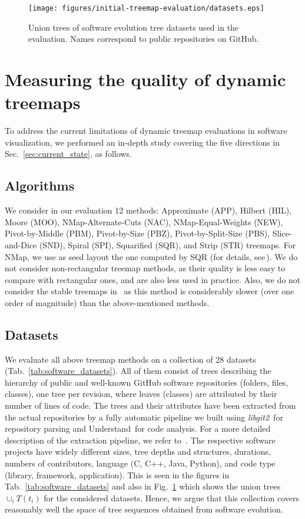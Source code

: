 \begin{figure}[htbp!]
\centering
\texttt{[image: figures/initial-treemap-evaluation/datasets.eps]}
\caption{Union trees of software evolution tree datasets used in the evaluation. Names correspond to public repositories on GitHub.}
\label{fig:datasets}
\end{figure}


\section{Measuring the quality of dynamic treemaps}
\label{sec:init_metrics}
%
%
To address the current limitations of dynamic treemap evaluations in software visualization, we performed an in-depth study covering the five directions in Sec.~\ref{sec:current_state}, as follows.

\subsection{Algorithms}
\label{sec:mat_algos}
%
We consider in our evaluation 12 methods: Approximate (APP), Hilbert (HIL), Moore (MOO), NMap-Alternate-Cuts (NAC), NMap-Equal-Weights (NEW), Pivot-by-Middle (PBM), Pivot-by-Size (PBZ), Pivot-by-Split-Size (PBS), Slice-and-Dice (SND), Spiral (SPI), Squarified (SQR), and Strip (STR) treemaps. For NMap, we use as seed layout the one computed by SQR (for details, see\,\cite{nmap}). We do not consider non-rectangular treemap methods, as their quality is less easy to compare with rectangular ones, and are also less used in practice. Also, we do not consider the stable treemaps in~\citep{sondag17} as this method is considerably slower (over one order of magnitude) than the above-mentioned methods.

\subsection{Datasets}
\label{sec:mat_data}
%
We evaluate all above treemap methods on a collection of 28 datasets (Tab.~\ref{tab:software_datasets}). All of them consist of trees describing the hierarchy of public and well-known GitHub software repositories (folders, files, classes), one tree per revision, where leaves (classes) are attributed by their number of lines of code. The trees and their attributes have been extracted from the actual repositories by a fully automatic pipeline we built using \emph{libgit2}\,\citep{libgit2} for repository parsing and Understand\,\citep{understand} for code analysis. For a more detailed description of the extraction pipeline, we refer to~\cite{vmv}. The respective software projects have widely different sizes, tree depths and structures, durations, numbers of contributors, language (C, C++, Java, Python), and code type (library, framework, application). This is seen in the figures in Tab.~\ref{tab:software_datasets} and also in Fig.~\ref{fig:datasets} which shows the union trees $\cup_{i} T(t_i)$ for the considered datasets. Hence, we argue that this collection covers reasonably well the space of tree sequences obtained from software evolution.

